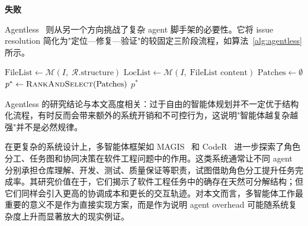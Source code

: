 \begin{algorithm}[H]
\caption{AutoCodeRover: 层次化搜索定位 + 补丁生成}
\label{alg:autocoderover}
\Return \textbf{失败}\;
\end{algorithm}

Agentless~\cite{xia2024agentless} 则从另一个方向挑战了复杂 agent 脚手架的必要性。它将 issue resolution 简化为"定位—修复—验证"的较固定三阶段流程，如算法~\ref{alg:agentless} 所示。

\begin{algorithm}[H]
\caption{Agentless: 结构化三阶段 Github Issue Resolution}
\label{alg:agentless}
$\text{FileList} \leftarrow \mathcal{M}(I,\;\mathcal{R}.\text{structure})$
$\text{LocList} \leftarrow \mathcal{M}(I,\;\text{FileList content})$
$\text{Patches} \leftarrow \emptyset$\;
$p^* \leftarrow \textsc{RankAndSelect}(\text{Patches})$\;
\Return $p^*$\;
\end{algorithm}

Agentless 的研究结论与本文高度相关：过于自由的智能体规划并不一定优于结构化流程，有时反而会带来额外的系统开销和不可控行为，这说明"智能体越复杂越强"并不是必然规律。

在更复杂的系统设计上，多智能体框架如 MAGIS~\cite{tao2024magis} 和 CodeR~\cite{chen2024coder} 进一步探索了角色分工、任务图和协同决策在软件工程问题中的作用。这类系统通常让不同 agent 分别承担仓库理解、开发、测试、质量保证等职责，试图借助角色分工提升任务完成率。其研究价值在于，它们揭示了软件工程任务中的确存在天然可分解结构；但它们同样会引入更高的协调成本和更长的交互轨迹。对本文而言，多智能体工作最重要的意义不是作为直接实现方案，而是作为说明 agent overhead 可能随系统复杂度上升而显著放大的现实例证。


